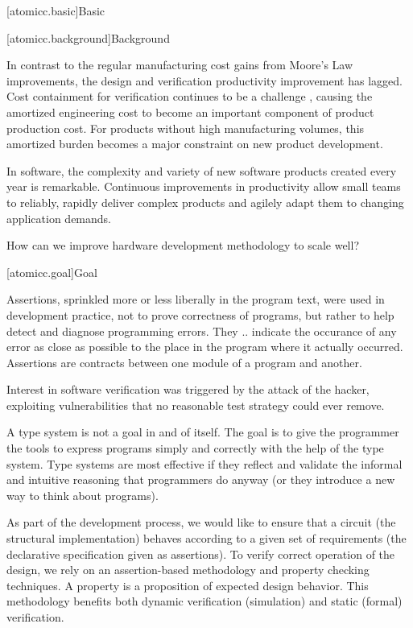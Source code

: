 [atomicc.basic]{Basic}

[atomicc.background]{Background}

In contrast to the regular manufacturing cost gains
from Moore's Law improvements, the design and verification productivity
improvement has lagged.
Cost containment
for verification continues to be a challenge \cite{foster2013design},
causing the amortized
engineering cost to become an important component of product production cost.
For products without high manufacturing volumes, this
amortized burden becomes a major constraint on new product development.

In software, the complexity and variety
of new software products created every year is remarkable.  
Continuous improvements in productivity allow small teams
to reliably, rapidly deliver complex products and agilely
adapt them to changing application demands.

How can we improve hardware development methodology to scale well?

[atomicc.goal]{Goal}

Assertions, sprinkled more or less liberally in the program text,
were used in development practice, not to prove correctness of
programs, but rather to help detect and diagnose programming errors.
They .. indicate the occurance of any error as close as possible
to the place in the program where it actually occurred.
Assertions are contracts between one module of a program
and another.

Interest in software verification was triggered by the attack of the
hacker, exploiting vulnerabilities that no reasonable test strategy
could ever remove.

A type system is not a goal in and of itself.  The goal is to give the programmer
the tools to express programs simply and correctly with the help of the type system.
Type systems are most effective if they reflect and validate the informal
and intuitive reasoning that programmers do anyway (or they introduce a
new way to think about programs).

As part of the development process, we would like to ensure that a
circuit (the structural implementation) behaves according to a given set
of requirements (the declarative specification given as assertions).
To verify correct operation of the design, we rely on an assertion-based
methodology and property checking techniques.
A property is a proposition of expected design behavior.
This methodology benefits both dynamic verification (simulation) and
static (formal) verification.

